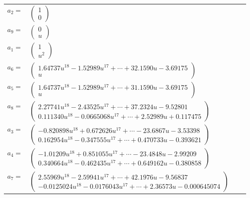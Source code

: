 \documentclass[1p]{elsarticle_modified}
\theoremstyle{definition}
\begin{document}
\begin{tabular}{m{7pt} m{180pt} m{7pt} m{180pt} }
\flushright $a_{2}=$&$\begin{pmatrix}1\\0\end{pmatrix}$ \\
\flushright $a_{9}=$&$\begin{pmatrix}0\\u\end{pmatrix}$ \\
\flushright $a_{1}=$&$\begin{pmatrix}1\\u^2\end{pmatrix}$ \\
\flushright $a_{6}=$&$\begin{pmatrix}1.64737 u^{18}-1.52989 u^{17}+\cdots+32.1590 u-3.69175\\u\end{pmatrix}$ \\
\flushright $a_{5}=$&$\begin{pmatrix}1.64737 u^{18}-1.52989 u^{17}+\cdots+31.1590 u-3.69175\\u\end{pmatrix}$ \\
\flushright $a_{8}=$&$\begin{pmatrix}2.27741 u^{18}-2.43525 u^{17}+\cdots+37.2324 u-9.52801\\0.111340 u^{18}-0.0665068 u^{17}+\cdots+2.52989 u+0.117475\end{pmatrix}$ \\
\flushright $a_{3}=$&$\begin{pmatrix}-0.820898 u^{18}+0.672626 u^{17}+\cdots-23.6867 u-3.53398\\0.162954 u^{18}-0.347555 u^{17}+\cdots+0.470733 u-0.393621\end{pmatrix}$ \\
\flushright $a_{4}=$&$\begin{pmatrix}-1.01209 u^{18}+0.851055 u^{17}+\cdots-23.4848 u-2.99209\\0.340664 u^{18}-0.462435 u^{17}+\cdots+0.649162 u-0.380858\end{pmatrix}$ \\
\flushright $a_{7}=$&$\begin{pmatrix}2.55969 u^{18}-2.59941 u^{17}+\cdots+42.1976 u-9.56837\\-0.0125024 u^{18}-0.0176043 u^{17}+\cdots+2.36573 u-0.000645074\end{pmatrix}$ \\

\end{tabular}
\end{document}
